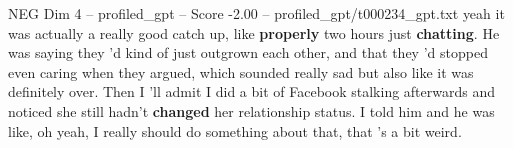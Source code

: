 \begin{textsample}{NEG Dim 4 – profiled\_gpt – Score -2.00 – profiled\_gpt/t000234\_gpt.txt}  \label{ex:f4_neg_011}
yeah it was actually a really good catch up, like \textbf{properly} two hours just \textbf{chatting}.
He was saying they ’d kind of just outgrown each other, and that they ’d stopped even caring when they argued, which sounded really sad but also like it was definitely over.
Then I ’ll admit I did a bit of Facebook stalking afterwards and noticed she still hadn't \textbf{changed} her relationship status.
I told him and he was like, oh yeah, I really should do something about that, that ’s a bit weird.

\end{textsample}
